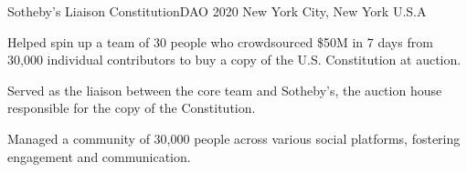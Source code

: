 \begin{cventries}
  \cventry
    {Sotheby's Liaison} %
    {ConstitutionDAO} %
    {2020} %
    {New York City, New York U.S.A} %
    {
      \begin{cvitems} %
        \item {Helped spin up a team of 30 people who crowdsourced \$50M in 7 days from 30,000 individual contributors to buy a copy of the U.S. Constitution at auction.}
        \item {Served as the liaison between the core team and Sotheby's, the auction house responsible for the copy of the Constitution.}
        \item {Managed a community of 30,000 people across various social platforms, fostering engagement and communication.}
      \end{cvitems}
    }

\end{cventries}
